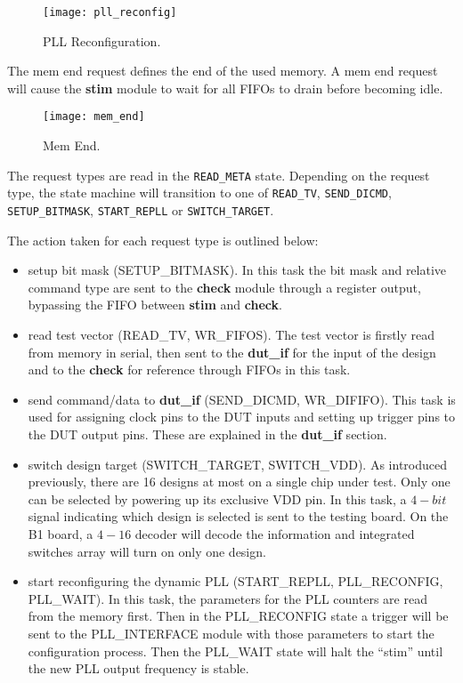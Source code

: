 \begin{figure}[h]
 \centering
 \texttt{[image: pll\_reconfig]}
 \caption{PLL Reconfiguration.}
 \label{fig:req_pll_reconfig}
\end{figure}


The mem end request defines the end of the used memory. A mem end request will cause the \textbf{stim} module
to wait for all FIFOs to drain before becoming idle.
\begin{figure}[h]
 \centering
 \texttt{[image: mem\_end]}
 \caption{Mem End.}
 \label{fig:req_mem_end}
\end{figure}



The request types are read in the \texttt{READ\_META} state. Depending on the request type, the state machine will transition to
one of \texttt{READ\_TV}, \texttt{SEND\_DICMD}, \texttt{SETUP\_BITMASK}, \texttt{START\_REPLL} or \texttt{SWITCH\_TARGET}.

The action taken for each request type is outlined below:
\begin{itemize}
 \item setup bit mask (SETUP\_BITMASK). In this task the bit mask and relative command type are sent to the \textbf{check} module through a register output, bypassing the FIFO between \textbf{stim} and \textbf{check}.

 \item read test vector (READ\_TV, WR\_FIFOS). The test vector is firstly read from memory in serial, then sent to the \textbf{dut\_if} for the input of the design and to the \textbf{check} for reference through FIFOs in this task.

 \item send command/data to \textbf{dut\_if} (SEND\_DICMD, WR\_DIFIFO). This task is used for assigning clock pins to the DUT inputs and setting up trigger pins to the DUT output pins. These are explained in the \textbf{dut\_if} section.

 \item switch design target (SWITCH\_TARGET, SWITCH\_VDD). As introduced previously, there are 16 designs at most on a single chip under test. Only one can be selected by powering up its exclusive VDD pin. In this task, a $4-bit$ signal indicating which design is selected is sent to the testing board. On the B1 board, a $4-16$ decoder will decode the information and integrated switches array will turn on only one design.

 \item start reconfiguring the dynamic PLL (START\_REPLL, PLL\_RECONFIG, PLL\_WAIT). In this task, the parameters for the PLL counters are read from the memory first. Then in the PLL\_RECONFIG state a trigger will be sent to the PLL\_INTERFACE module with those parameters to start the configuration process. Then the PLL\_WAIT state will halt the ``stim'' until the new PLL output frequency is stable.
\end{itemize}

